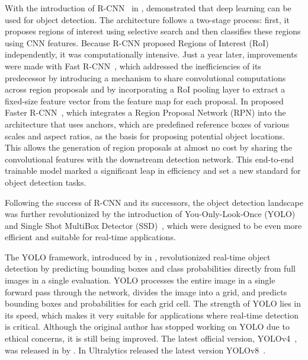 With the introduction of R-CNN~\cite{Girshick14} in \citeyear{Girshick14}, \citeauthor{Girshick14} demonstrated that deep learning can be used for object detection. The architecture follows a two-stage process: first, it proposes regions of interest using selective search and then classifies these regions using CNN features. Because R-CNN proposed Regions of Interest (RoI) independently, it was computationally intensive. Just a year later, improvements were made with Fast R-CNN~\cite{Girshick15}, which addressed the inefficiencies of its predecessor by introducing a mechanism to share convolutional computations across region proposals and by incorporating a RoI pooling layer to extract a fixed-size feature vector from the feature map for each proposal. In \citeyear{Ren17} \citeauthor{Ren17} proposed Faster R-CNN~\cite{Ren17}, which integrates a Region Proposal Network (RPN) into the architecture that uses anchors, which are predefined reference boxes of various scales and aspect ratios, as the basis for proposing potential object locations. This allows the generation of region proposals at almost no cost by sharing the convolutional features with the downstream detection network. This end-to-end trainable model marked a significant leap in efficiency and set a new standard for object detection tasks.

Following the success of R-CNN and its successors, the object detection landscape was further revolutionized by the introduction of You-Only-Look-Once (YOLO)~\cite{Redmon15} and Single Shot MultiBox Detector (SSD)~\cite{Liu15}, which were designed to be even more efficient and suitable for real-time applications.

The YOLO framework, introduced by \citeauthor{Redmon15} in \citeyear{Redmon15}, revolutionized real-time object detection by predicting bounding boxes and class probabilities directly from full images in a single evaluation. YOLO processes the entire image in a single forward pass through the network, divides the image into a grid, and predicts bounding boxes and probabilities for each grid cell. The strength of YOLO lies in its speed, which makes it very suitable for applications where real-time detection is critical. Although the original author has stopped working on YOLO due to ethical concerns, it is still being improved. The latest official version, YOLOv4~\cite{Bochkovskiy20}, was released in \citeyear{Bochkovskiy20} by \citeauthor{Bochkovskiy20}. In \citeyear{Jocher23a} Ultralytics released the latest version YOLOv8~\cite{Jocher23a, Jocher23b}.

